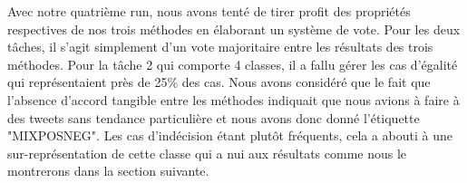  Avec notre quatrième run, nous avons tenté de tirer profit des propriétés respectives de nos trois méthodes en élaborant un système de vote.
 Pour les deux tâches, il s'agit simplement d'un vote majoritaire entre les résultats des trois méthodes.
Pour la tâche 2 qui comporte 4 classes, il a fallu gérer les cas d'égalité qui représentaient près de 25\% des cas.
 Nous avons considéré que le fait que l'absence d'accord tangible entre les méthodes indiquait que nous avions à faire à des tweets sans tendance particulière et nous avons donc donné l'étiquette "MIXPOSNEG". Les cas d'indécision étant plutôt fréquents, cela a abouti à une sur-représentation de cette classe qui a nui aux résultats comme nous le montrerons dans la section suivante.
